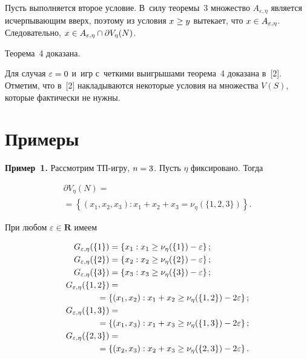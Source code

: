 \begin{multicols}{2}
    Пусть выполняется второе условие. В~силу тео\-ре\-мы~3 множество $ 
A_{\varepsilon,\eta}$ является исчерпывающим вверх, поэтому из условия 
$x\hm\geq y$ вытекает, что $x\hm\in A_{\varepsilon,\eta}$. Следовательно, 
$x\hm\in A_{\varepsilon,\eta} \cap \partial V_\eta(N)$. 

    Теорема~4 доказана.

\smallskip

    Для случая $\varepsilon\hm=0$ и~игр с~четкими выигрышами теорема~4 
доказана в~[2]. Отметим, что в~[2] накладываются некоторые условия на 
множества $V(S)$, которые фактически не нужны.

\vspace*{-7pt} 

\section{Примеры}

\vspace*{-2pt}

     \textbf{Пример~1.} Рассмотрим ТП-игру, 
$n\hm=3$. Пусть $\eta$ фиксировано. Тогда

\vspace*{-2pt}

\noindent
     \begin{multline*}
     \partial V_\eta(N) ={}\\
     {}=\left\{ (x_1, x_2, x_3): 
x_1+x_2+x_3=\nu_\eta(\{1,2,3\})\right\}.
     \end{multline*}
     
     \vspace*{-2pt}
     
     \noindent
При любом $\varepsilon\in \mathbf{R}$ имеем

\noindent
\begin{align*}
G_{\varepsilon,\eta}(\{1\}) &= \left\{ x_1: x_1\geq \nu_\eta(\{1\})-
\varepsilon\right\};\\
G_{\varepsilon,\eta}(\{2\}) &=\left\{ x_2: x_2\geq \nu_\eta(\{2\})-
\varepsilon\right\};\\
G_{\varepsilon,\eta}(\{3\}) &= \left\{ x_3: x_3\geq \nu_\eta(\{3\})-
\varepsilon\right\};\\
G_{\varepsilon,\eta}(\{1,2\}) &={}\\
&\hspace*{-5mm}{}= \left\{ (x_1,x_2): x_1+x_2\geq \nu_\eta(\{1,2\}) -
2\varepsilon\right\};\\
G_{\varepsilon,\eta}(\{1,3\}) &={}\\
&\hspace*{-5mm}{}= \left\{ (x_1,x_3): x_1+x_3\geq \nu_\eta(\{1,3\}) -
2\varepsilon\right\};\\
G_{\varepsilon,\eta}(\{2,3\}) &= {}\\
&\hspace*{-5mm}{}=\left\{ (x_2,x_3): x_2+x_3\geq \nu_\eta(\{2,3\}) -
2\varepsilon\right\}.
\end{align*}


\end{multicols}
